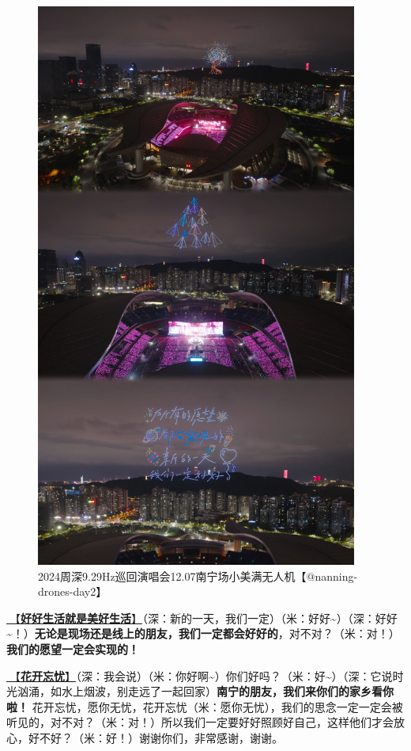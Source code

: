 \documentclass[]{ctexbook}
\begin{document}
\begin{figure}

{\centering \includegraphics[width=300pt]{img/nanning20241207/001} 

}

\caption{2024周深9.29Hz巡回演唱会12.07南宁场小美满无人机【@nanning-drones-day2】}\label{fig:unnamed-chunk-137}
\end{figure}

\hyperref[live-happy-life-happy]{🎵【\textbf{好好生活就是美好生活}】}（深：新的一天，我们一定）（米：好好\textasciitilde）（深：好好\textasciitilde！）\textbf{无论是现场还是线上的朋友，我们一定都会好好的}，对不对？（米：对！）\textbf{我们的愿望一定会实现的！}

\hyperref[no-worries]{🎵【\textbf{花开忘忧}】}（深：我会说）（米：你好啊\textasciitilde）你们好吗？（米：好\textasciitilde）（深：它说时光汹涌，如水上烟波，别走远了一起回家）\textbf{南宁的朋友，我们来你们的家乡看你啦！} 花开忘忧，愿你无忧，花开忘忧（米：愿你无忧），我们的思念一定一定会被听见的，对不对？（米：对！）所以我们一定要好好照顾好自己，这样他们才会放心，好不好？（米：好！）谢谢你们，非常感谢，谢谢。
\end{document}
